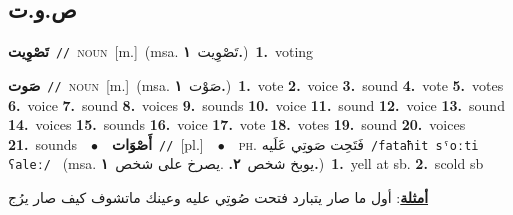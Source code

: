 \documentclass[10pt,a4paper,twoside]{article} %
\begin{document}
\begin{multicols}{2}
\vspace{-3mm}
\subsection*{\color{blue}\foreignlanguage{arabic}{ص.و.ت}\color{blue}{}} 

{\setlength\topsep{0pt}\textbf{\foreignlanguage{arabic}{تَصْوِيت}}\ {\color{gray}\texttt{//}\color{black}}\ \textsc{noun}\ [m.]\ \color{gray}(msa. \foreignlanguage{arabic}{تَصْوِيت}~\foreignlanguage{arabic}{\textbf{١.}})\color{black}\ \textbf{1.}~voting\ } \vspace{2mm}

{\setlength\topsep{0pt}\textbf{\foreignlanguage{arabic}{صَوت}}\ {\color{gray}\texttt{//}\color{black}}\ \textsc{noun}\ [m.]\ \color{gray}(msa. \foreignlanguage{arabic}{صَوْت}~\foreignlanguage{arabic}{\textbf{١.}})\color{black}\ \textbf{1.}~vote  \textbf{2.}~voice  \textbf{3.}~sound  \textbf{4.}~vote  \textbf{5.}~votes  \textbf{6.}~voice  \textbf{7.}~sound  \textbf{8.}~voices  \textbf{9.}~sounds  \textbf{10.}~voice  \textbf{11.}~sound  \textbf{12.}~voice  \textbf{13.}~sound  \textbf{14.}~voices  \textbf{15.}~sounds  \textbf{16.}~voice  \textbf{17.}~vote  \textbf{18.}~votes  \textbf{19.}~sound  \textbf{20.}~voices  \textbf{21.}~sounds\ \ $\bullet$\ \ \setlength\topsep{0pt}\textbf{\foreignlanguage{arabic}{أَصْوَات}}\ {\color{gray}\texttt{//}\color{black}}\ [pl.]\ \ $\bullet$\ \ \textsc{ph.} \color{gray} \foreignlanguage{arabic}{فَتَحِت صَوتِي عَلَيه}\color{black}\ {\color{gray}\texttt{/{\sffamily fataħit sˤoːti ʕaleː}/}\color{black}}\ \color{gray} (msa. \foreignlanguage{arabic}{يوبخ شخص}~\foreignlanguage{arabic}{\textbf{٢.}}  .\foreignlanguage{arabic}{يصرخ على شخص}~\foreignlanguage{arabic}{\textbf{١.}})\color{black}\ \textbf{1.}~yell at sb.  \textbf{2.}~scold sb\  \begin{flushright}\color{gray}\foreignlanguage{arabic}{\textbf{\underline{\foreignlanguage{arabic}{أمثلة}}}: أول ما صار يتبارد فتحت صُوتِي عليه وعينك ماتشوف كيف صار يرُج}\end{flushright}\color{black}} \vspace{2mm}


\end{multicols}
\end{document}

